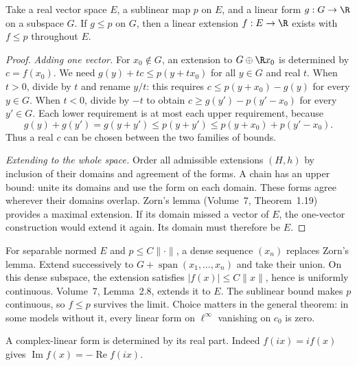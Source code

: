 \begin{theorem}\label{thm:hb}
Take a real vector space $E$, a sublinear map $p$ on $E$, and a linear form $g:G\to\R$ on a subspace $G$. If $g\le p$ on $G$, then a linear extension $f:E\to\R$ exists with $f\le p$ throughout $E$.
\end{theorem}
\begin{proof}
\emph{Adding one vector.} For $x_0\notin G$, an extension to $G\oplus\R x_0$ is determined by $c=f(x_0)$. We need $g(y)+tc\le p(y+tx_0)$ for all $y\in G$ and real $t$. When $t>0$, divide by $t$ and rename $y/t$: this requires $c\le p(y+x_0)-g(y)$ for every $y\in G$. When $t<0$, divide by $-t$ to obtain $c\ge g(y')-p(y'-x_0)$ for every $y'\in G$. Each lower requirement is at most each upper requirement, because
\[g(y)+g(y')=g(y+y')\le p(y+y')\le p(y+x_0)+p(y'-x_0).\]
Thus a real $c$ can be chosen between the two families of bounds.

\emph{Extending to the whole space.} Order all admissible extensions $(H,h)$ by inclusion of their domains and agreement of the forms. A chain has an upper bound: unite its domains and use the form on each domain. These forms agree wherever their domains overlap. Zorn's lemma (Volume~7, Theorem~1.19) provides a maximal extension. If its domain missed a vector of $E$, the one-vector construction would extend it again. Its domain must therefore be $E$.
\end{proof}

\begin{remark}
For separable normed $E$ and $p\le C\|\cdot\|$, a dense sequence $(x_n)$ replaces Zorn's lemma. Extend successively to $G+\operatorname{span}(x_1,\dots,x_n)$ and take their union. On this dense subspace, the extension satisfies $|f(x)|\le C\|x\|$, hence is uniformly continuous. Volume~7, Lemma~2.8, extends it to $E$. The sublinear bound makes $p$ continuous, so $f\le p$ survives the limit. Choice matters in the general theorem: in some models without it, every linear form on $\ell^\infty$ vanishing on $c_0$ is zero.
\end{remark}

A complex-linear form is determined by its real part. Indeed $f(ix)=if(x)$ gives $\operatorname{Im}f(x)=-\operatorname{Re}f(ix)$.

